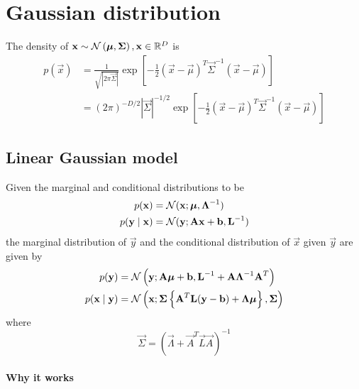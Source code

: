 \section{Gaussian distribution}
\label{sec:basics/gaussian}
The density of $\boldsymbol{\mathbf{x}} \sim \operatorname{\mathcal N}\left(\boldsymbol{\mathbf{\mu}}, \boldsymbol{\mathbf{\Sigma}}\right), \boldsymbol{\mathbf{x}} \in \mathbb R^D$ is
\begin{align}
    p(\vec x)   &= \frac{1}{\sqrt{|2\pi\vec \Sigma|}} \exp{\left[-\frac{1}{2}(\vec x - \vec \mu)^T \vec \Sigma^{-1} (\vec x - \vec \mu)\right]} \\
                &= (2\pi)^{-D / 2} |\vec \Sigma|^{-1 / 2} \exp{\left[-\frac{1}{2}(\vec x - \vec \mu)^T \vec \Sigma^{-1} (\vec x - \vec \mu)\right]}
\end{align}
\subsection{Linear Gaussian model}
\label{ssec:basics/gaussian/lin}
Given the marginal and conditional distributions to be
\begin{align}
    p(\boldsymbol{\mathbf{x}})               &= \operatorname{\mathcal N}(\boldsymbol{\mathbf{x}}; \boldsymbol{\mathbf{\mu}}, \boldsymbol{\mathbf{\Lambda}}^{-1}) \label{eqn:prob-gaussian-lingauss1} \\
    p(\boldsymbol{\mathbf{y}} \mid \boldsymbol{\mathbf{x}})   &= \operatorname{\mathcal N}(\boldsymbol{\mathbf{y}}; \boldsymbol{\mathbf{A}} \boldsymbol{\mathbf{x}} + \boldsymbol{\mathbf{b}}, \boldsymbol{\mathbf{L}}^{-1}) \label{eqn:prob-gaussian-lingauss2}
\end{align}
the marginal distribution of $\vec y$ and the conditional distribution of $\vec x$ given $\vec y$ are given by
\begin{align}
    p(\boldsymbol{\mathbf{y}})               &= \operatorname{\mathcal N}\left(\boldsymbol{\mathbf{y}}; \boldsymbol{\mathbf{A}} \boldsymbol{\mathbf{\mu}} + \boldsymbol{\mathbf{b}}, \boldsymbol{\mathbf{L}}^{-1} + \boldsymbol{\mathbf{A}} \boldsymbol{\mathbf{\Lambda}}^{-1} \boldsymbol{\mathbf{A}}^T\right) \label{eqn:prob-gaussian-lingauss3}\\
    p(\boldsymbol{\mathbf{x}} \mid \boldsymbol{\mathbf{y}})   &= \operatorname{\mathcal N}\left(\boldsymbol{\mathbf{x}}; \boldsymbol{\mathbf{\Sigma}}\left\{\boldsymbol{\mathbf{A}}^T \boldsymbol{\mathbf{L}}(\boldsymbol{\mathbf{y}} - \boldsymbol{\mathbf{b}}) + \boldsymbol{\mathbf{\Lambda}} \boldsymbol{\mathbf{\mu}}\right\}, \boldsymbol{\mathbf{\Sigma}}\right) \label{eqn:prob-gaussian-lingauss4}
\end{align}
where
\begin{equation}
    \vec \Sigma = \left(\vec \Lambda + \vec A^T \vec L \vec A \right)^{-1} \label{eqn:prob-gaussian-lingauss5}
\end{equation}

\paragraph{Why it works}